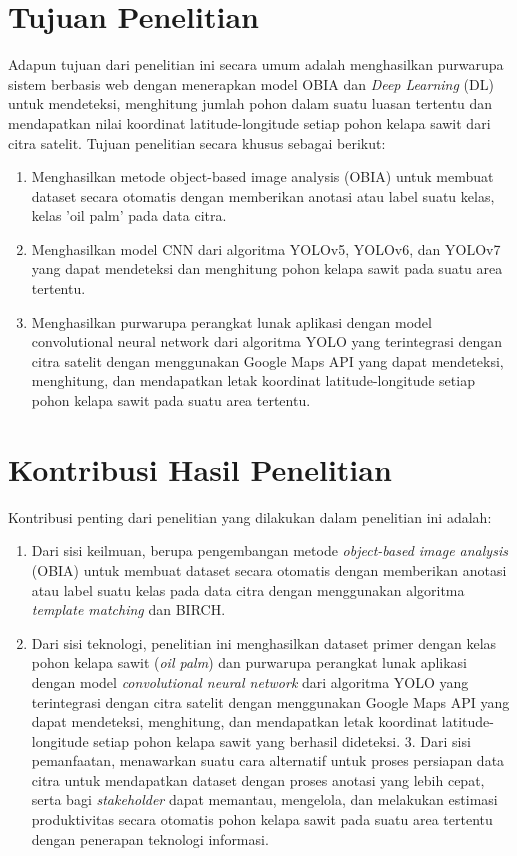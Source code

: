 \section{Tujuan Penelitian}
\label{sec:4-BatasanMasalah}
\hspace{1,2cm}Adapun tujuan dari penelitian ini secara umum adalah menghasilkan purwarupa sistem berbasis web dengan menerapkan model OBIA dan \textit{Deep Learning} (DL) untuk mendeteksi, menghitung jumlah pohon dalam suatu luasan tertentu dan mendapatkan nilai koordinat latitude-longitude setiap pohon kelapa sawit dari citra satelit. Tujuan penelitian secara khusus sebagai berikut: 
\begin{enumerate}
	\item Menghasilkan metode object-based image analysis (OBIA) untuk membuat dataset secara otomatis dengan memberikan anotasi atau label suatu kelas, kelas 'oil palm' pada data citra.
	\item Menghasilkan model CNN dari algoritma YOLOv5, YOLOv6, dan YOLOv7 yang dapat mendeteksi dan menghitung pohon kelapa sawit pada suatu area tertentu.
	\item Menghasilkan purwarupa perangkat lunak aplikasi dengan model convolutional neural network dari algoritma YOLO yang terintegrasi dengan citra satelit dengan menggunakan Google Maps API yang dapat mendeteksi, menghitung, dan mendapatkan letak koordinat latitude-longitude setiap pohon kelapa sawit pada suatu area tertentu.
\end{enumerate}

\section{Kontribusi Hasil Penelitian}
\label{sec:5-Kontribusi-Hasil-Penelitian}
\hspace{1,2cm}Kontribusi penting dari penelitian yang dilakukan dalam penelitian ini adalah:
\begin{enumerate}
	\item Dari sisi keilmuan, berupa pengembangan metode \textit{object-based image analysis} (OBIA) untuk membuat dataset secara otomatis dengan memberikan anotasi atau label suatu kelas pada data citra dengan menggunakan algoritma \textit{template matching} dan BIRCH.
	\item Dari sisi teknologi, penelitian ini menghasilkan dataset primer dengan kelas pohon kelapa sawit (\textit{oil palm}) dan purwarupa perangkat lunak aplikasi dengan model \textit{convolutional neural network} dari algoritma YOLO yang terintegrasi dengan citra satelit dengan menggunakan Google Maps API yang dapat mendeteksi, menghitung, dan mendapatkan letak koordinat latitude-longitude setiap pohon kelapa sawit yang berhasil dideteksi.
	3.	Dari sisi pemanfaatan, menawarkan suatu cara alternatif untuk proses persiapan data citra untuk mendapatkan dataset dengan proses anotasi yang lebih cepat, serta bagi \textit{stakeholder} dapat memantau, mengelola, dan melakukan estimasi produktivitas secara otomatis pohon kelapa sawit pada suatu area tertentu dengan penerapan teknologi informasi.
	
\end{enumerate}

